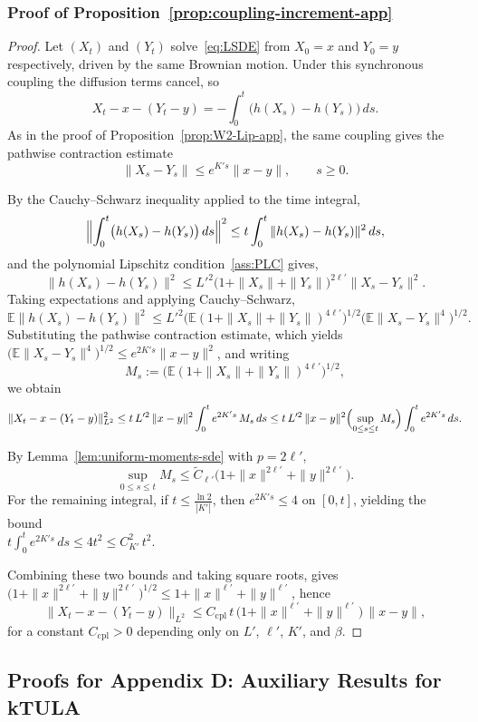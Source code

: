 \documentclass[11pt,a4paper,reqno]{amsart}
\theoremstyle{plain}
\theoremstyle{definition}
\theoremstyle{remark}
\newcommand{\E}{\mathbb{E}}
\begin{document}
\subsubsection{Proof of Proposition~\ref{prop:coupling-increment-app}}
\label{proof:coupling-increment}
\begin{proof}
Let $(X_t)$ and $(Y_t)$ solve~\eqref{eq:LSDE} from $X_0=x$ and $Y_0=y$
respectively, driven by the same Brownian motion. Under this synchronous
coupling the diffusion terms cancel, so
\[
  X_t-x-(Y_t-y)
  =
  -\int_0^t \bigl(h(X_s)-h(Y_s)\bigr)\,ds.
\]
As in the proof of Proposition~\ref{prop:W2-Lip-app}, the same coupling gives
the pathwise contraction estimate
\[
  \|X_s-Y_s\|\le e^{K's}\|x-y\|,
  \qquad s\ge 0.
\]

By the Cauchy--Schwarz inequality applied to the time integral,
\[
  \Bigl\|\int_0^t \bigl(h(X_s)-h(Y_s)\bigr)\,ds\Bigr\|^2
  \le
  t\int_0^t \|h(X_s)-h(Y_s)\|^2\,ds,
\]
and the polynomial Lipschitz condition~\ref{ass:PLC} gives,
\[
  \|h(X_s)-h(Y_s)\|^2
  \le
  L'^2\bigl(1+\|X_s\|+\|Y_s\|\bigr)^{2\ell'}\|X_s-Y_s\|^2.
\]
Taking expectations and applying Cauchy--Schwarz,
\[
  \E\|h(X_s)-h(Y_s)\|^2
  \le
  L'^2
  \bigl(\E(1+\|X_s\|+\|Y_s\|)^{4\ell'}\bigr)^{1/2}
  \bigl(\E\|X_s-Y_s\|^{4}\bigr)^{1/2}.
\]
Substituting the pathwise contraction estimate, which yields
$\bigl(\E\|X_s-Y_s\|^{4}\bigr)^{1/2}\le e^{2K's}\|x-y\|^2$, and writing
\[
  M_s:=\bigl(\E(1+\|X_s\|+\|Y_s\|)^{4\ell'}\bigr)^{1/2},
\]
we obtain
\[
  \|X_t-x-(Y_t-y)\|_{L^2}^2
  \le
  t\,L'^2\,\|x-y\|^2
  \int_0^t e^{2K's}\,M_s\,ds
  \le
  t\,L'^2\,\|x-y\|^2
  \Bigl(\sup_{0\le s\le t}M_s\Bigr)
  \int_0^t e^{2K's}\,ds.
\]

By Lemma~\ref{lem:uniform-moments-sde} with $p=2\ell'$,
\[
  \sup_{0\le s\le t}M_s
  \le
  \widetilde C_{\ell'}\bigl(1+\|x\|^{2\ell'}+\|y\|^{2\ell'}\bigr).
\]
For the remaining integral, if $t\le\frac{\ln 2}{|K'|}$, then $e^{2K's}\le 4$ on $[0,t]$, yielding the bound \\
$t\int_0^t e^{2K's}\,ds\le 4t^2 \le C_{K'}^2\,t^2$.

Combining these two bounds and taking square roots, gives
$\bigl(1+\|x\|^{2\ell'}+\|y\|^{2\ell'}\bigr)^{1/2}\le 1+\|x\|^{\ell'}+\|y\|^{\ell'}$,
hence
\[
  \|X_t-x-(Y_t-y)\|_{L^2}
  \le
  C_{\mathrm{cpl}}\,t\,\bigl(1+\|x\|^{\ell'}+\|y\|^{\ell'}\bigr)\,\|x-y\|,
\]
for a constant $C_{\mathrm{cpl}}>0$ depending only on $L'$, $\ell'$, $K'$, and
$\beta$.
\end{proof}


\subsection{Proofs for Appendix D: Auxiliary Results for kTULA}
\end{document}
